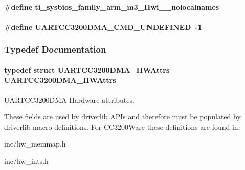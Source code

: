 \paragraph[{ti\-\_\-sysbios\-\_\-family\-\_\-arm\-\_\-m3\-\_\-\-Hwi\-\_\-\-\_\-nolocalnames}]{\setlength{\rightskip}{0pt plus 5cm}\#define ti\-\_\-sysbios\-\_\-family\-\_\-arm\-\_\-m3\-\_\-\-Hwi\-\_\-\-\_\-nolocalnames}\label{_u_a_r_t_c_c3200_d_m_a_8h_aaa17ecf48f5762e2e1bdb0bab8aacf0c}
\paragraph[{U\-A\-R\-T\-C\-C3200\-D\-M\-A\-\_\-\-C\-M\-D\-\_\-\-U\-N\-D\-E\-F\-I\-N\-E\-D}]{\setlength{\rightskip}{0pt plus 5cm}\#define U\-A\-R\-T\-C\-C3200\-D\-M\-A\-\_\-\-C\-M\-D\-\_\-\-U\-N\-D\-E\-F\-I\-N\-E\-D~-\/1}\label{_u_a_r_t_c_c3200_d_m_a_8h_a30cc7b6ae21e56f81bc4a9b4da8ad3b3}


\subsubsection{Typedef Documentation}
\paragraph[{U\-A\-R\-T\-C\-C3200\-D\-M\-A\-\_\-\-H\-W\-Attrs}]{\setlength{\rightskip}{0pt plus 5cm}typedef struct {\bf U\-A\-R\-T\-C\-C3200\-D\-M\-A\-\_\-\-H\-W\-Attrs}  {\bf U\-A\-R\-T\-C\-C3200\-D\-M\-A\-\_\-\-H\-W\-Attrs}}\label{_u_a_r_t_c_c3200_d_m_a_8h_a288a7e8d5d3c9cd0a6648e68bc375d47}


U\-A\-R\-T\-C\-C3200\-D\-M\-A Hardware attributes. 

These fields are used by driverlib A\-P\-Is and therefore must be populated by driverlib macro definitions. For C\-C3200\-Ware these definitions are found in\-:
\begin{DoxyItemize}
\item inc/hw\-\_\-memmap.\-h
\item inc/hw\-\_\-ints.\-h
\end{DoxyItemize}

